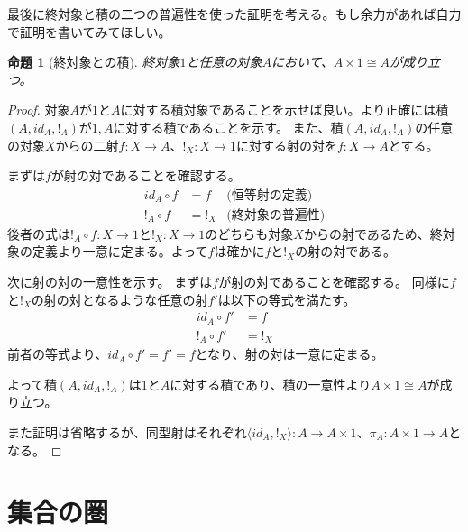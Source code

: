 \documentclass[uplatex,dvipdfmx]{jsarticle}
\newcommand{\arrow}{\rightarrow}
\newcommand{\tuple}[1]{\langle #1\rangle}
\newcommand{\mor}[3]{#1:#2\arrow #3}
\newtheorem{proof}{証明}[section]
\newtheorem{prop}{命題}[section]
\numberwithin{proof}{subsection}
\numberwithin{prop}{subsection}
\numberwithin{define}{subsection}
\begin{document}
  最後に終対象と積の二つの普遍性を使った証明を考える。もし余力があれば自力で証明を書いてみてほしい。
  \begin{prop}[終対象との積]
    終対象$1$と任意の対象$A$において、$A\times 1\cong A$が成り立つ。
  \end{prop}
  \begin{proof}
    対象$A$が$1$と$A$に対する積対象であることを示せば良い。より正確には積$(A,id_A,!_A)$が$1,A$に対する積であることを示す。
    また、積$(A,id_A,!_A)$の任意の対象$X$からの二射$\mor{f}{X}{A}$、$\mor{!_X}{X}{1}$に対する射の対を$\mor{f}{X}{A}$とする。
    
    \begin{center}
    \end{center}

    まずは$f$が射の対であることを確認する。
    \begin{align*}
      id_A\circ f &= f&\text{(恒等射の定義)}\\
      !_A\circ f &= !_X&\text{(終対象の普遍性)}
    \end{align*}
    後者の式は$\mor{!_A\circ f}{X}{1}$と$\mor{!_X}{X}{1}$のどちらも対象$X$からの射であるため、終対象の定義より一意に定まる。よって$f$は確かに$f$と$!_X$の射の対である。

    次に射の対の一意性を示す。
    まずは$f$が射の対であることを確認する。
    同様に$f$と$!_X$の射の対となるような任意の射$f'$は以下の等式を満たす。
    \begin{align*}
      id_A\circ f' &= f\\
      !_A\circ f' &= !_X
    \end{align*}
    前者の等式より、$id_A\circ f'=f'=f$となり、射の対は一意に定まる。

    よって積$(A,id_A,!_A)$は$1$と$A$に対する積であり、積の一意性より$A\times 1\cong A$が成り立つ。

    また証明は省略するが、同型射はそれぞれ$\mor{\tuple{id_A,!_X}}{A}{A\times 1}$、$\mor{\pi_A}{A\times 1}{A}$となる。
  \end{proof}
  \section{集合の圏}
\end{document}
